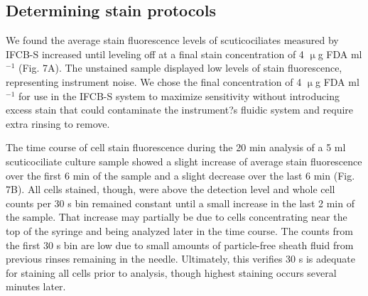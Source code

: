 \subsection{Determining stain protocols}
We found the average stain fluorescence levels of scuticociliates measured by IFCB-S increased until leveling off at a final stain concentration of 4 $\upmu$g FDA ml$^{-1}$ (Fig. 7A). The unstained sample displayed low levels of stain fluorescence, representing instrument noise. We chose the final concentration of 4 $\upmu$g FDA ml$^{-1}$ for use in the IFCB-S system to maximize sensitivity without introducing excess stain that could contaminate the instrument?s fluidic system and require extra rinsing to remove.

The time course of cell stain fluorescence during the 20 min analysis of a 5 ml scuticociliate culture sample showed a slight increase of average stain fluorescence over the first 6 min of the sample and a slight decrease over the last 6 min (Fig. 7B). All cells stained, though, were above the detection level and whole cell counts per 30 s bin remained constant until a small increase in the last 2 min of the sample. That increase may partially be due to cells concentrating near the top of the syringe and being analyzed later in the time course. The counts from the first 30 s bin are low due to small amounts of particle-free sheath fluid from previous rinses remaining in the needle. Ultimately, this verifies 30 s is adequate for staining all cells prior to analysis, though highest
staining occurs several minutes later.

